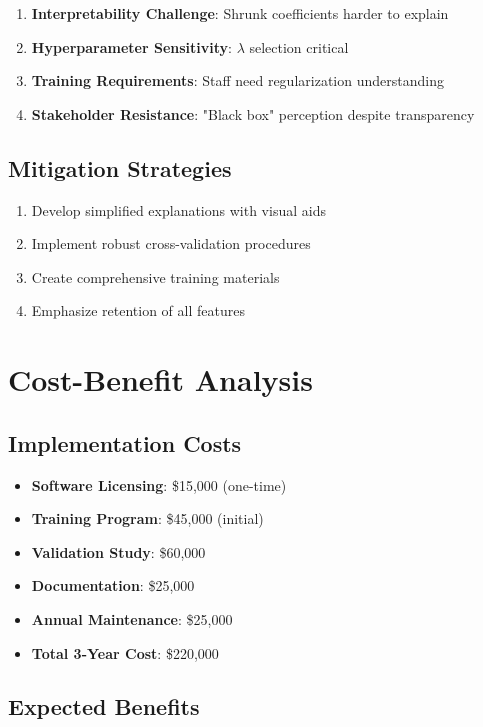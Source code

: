 \begin{enumerate}
    \item \textbf{Interpretability Challenge}: Shrunk coefficients harder to explain
    \item \textbf{Hyperparameter Sensitivity}: $\lambda$ selection critical
    \item \textbf{Training Requirements}: Staff need regularization understanding
    \item \textbf{Stakeholder Resistance}: "Black box" perception despite transparency
\end{enumerate}

\subsection{Mitigation Strategies}

\begin{enumerate}
    \item Develop simplified explanations with visual aids
    \item Implement robust cross-validation procedures
    \item Create comprehensive training materials
    \item Emphasize retention of all features
\end{enumerate}

\section{Cost-Benefit Analysis}

\subsection{Implementation Costs}

\begin{itemize}
    \item \textbf{Software Licensing}: \$15,000 (one-time)
    \item \textbf{Training Program}: \$45,000 (initial)
    \item \textbf{Validation Study}: \$60,000
    \item \textbf{Documentation}: \$25,000
    \item \textbf{Annual Maintenance}: \$25,000
    \item \textbf{Total 3-Year Cost}: \$220,000
\end{itemize}

\subsection{Expected Benefits}

